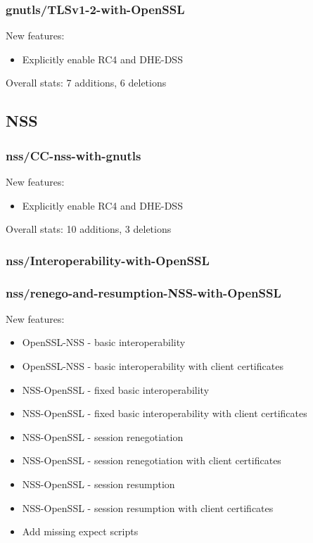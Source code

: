 \subsubsection{gnutls/TLSv1-2-with-OpenSSL}
    New features:
    \begin{itemize}
        \item Explicitly enable RC4 and DHE-DSS
    \end{itemize}

    Overall stats: 7 additions, 6 deletions

\subsection{NSS}
\subsubsection{nss/CC-nss-with-gnutls}
    New features:
    \begin{itemize}
        \item Explicitly enable RC4 and DHE-DSS
    \end{itemize}

    Overall stats: 10 additions, 3 deletions

\subsubsection{nss/Interoperability-with-OpenSSL}

\subsubsection{nss/renego-and-resumption-NSS-with-OpenSSL}
    New features:
    \begin{itemize}
        \item OpenSSL-NSS - basic interoperability
        \item OpenSSL-NSS - basic interoperability with client certificates
        \item NSS-OpenSSL - fixed basic interoperability
        \item NSS-OpenSSL - fixed basic interoperability with client
            certificates
        \item NSS-OpenSSL - session renegotiation
        \item NSS-OpenSSL - session renegotiation with client certificates
        \item NSS-OpenSSL - session resumption
        \item NSS-OpenSSL - session resumption with client certificates
        \item Add missing expect scripts
    \end{itemize}

